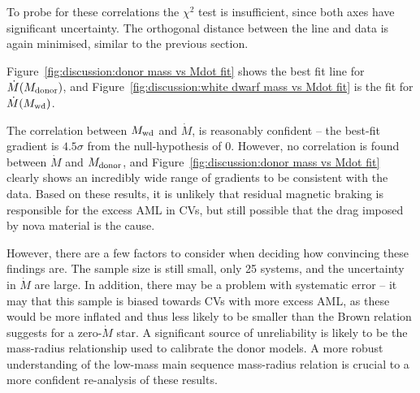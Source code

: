 To probe for these correlations the $\chi^2$ test is insufficient, since both axes have significant uncertainty. The orthogonal distance between the line and data is again minimised, similar to the previous section.

Figure~\ref{fig:discussion:donor mass vs Mdot fit} shows the best fit line for $\dot M(M_{\rm donor})$, and Figure~\ref{fig:discussion:white dwarf mass vs Mdot fit} is the fit for $\dot M(M_{\rm wd})$.

The correlation between $M_{\rm wd}$ and $\dot M$, is reasonably confident -- the best-fit gradient is $4.5\sigma$ from the null-hypothesis of 0.
However, no correlation is found between $\dot M$ and $M_{\rm donor}$, and Figure~\ref{fig:discussion:donor mass vs Mdot fit} clearly shows an incredibly wide range of gradients to be consistent with the data.
Based on these results, it is unlikely that residual magnetic braking is responsible for the excess AML in CVs, but still possible that the drag imposed by nova material is the cause.

However, there are a few factors to consider when deciding how convincing these findings are.
The sample size is still small, only 25 systems, and the uncertainty in $\dot M$ are large. In addition, there may be a problem with systematic error -- it may that this sample is biased towards CVs with more excess AML, as these would be more inflated and thus less likely to be smaller than the Brown relation suggests for a zero-$\dot M$ star.
A significant source of unreliability is likely to be the mass-radius relationship used to calibrate the donor models. A more robust understanding of the low-mass main sequence mass-radius relation is crucial to a more confident re-analysis of these results.

